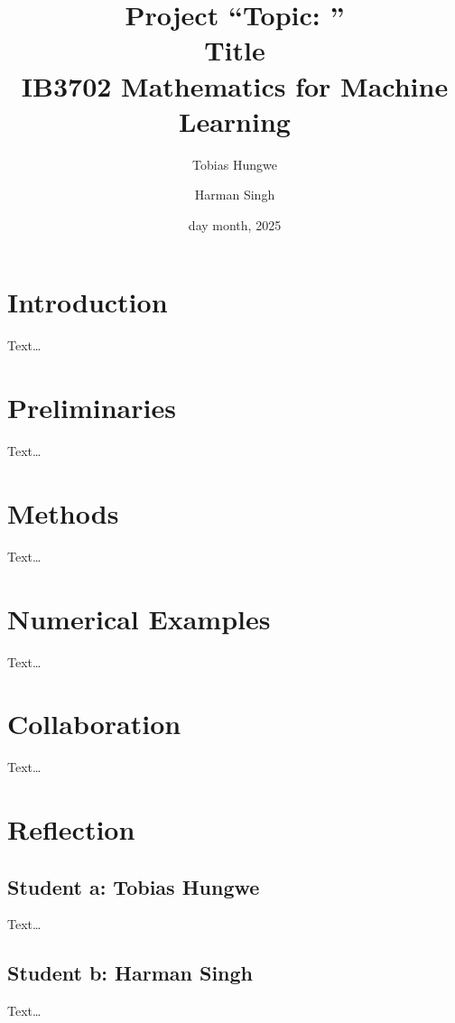 \documentclass[11pt, a4paper]{article}
\title{Project ``Topic: '' \\
	{Title} \\ 
	IB3702 Mathematics for Machine Learning} %
\author{Tobias Hungwe \and Harman Singh} %
\date{day month, 2025} %
\begin{document}
\maketitle

\section{Introduction}

Text\ldots

\section{Preliminaries}

Text\ldots


\section{Methods}

Text\ldots

\section{Numerical Examples}

Text\ldots

\section{Collaboration}

Text\ldots

\section{Reflection}

\subsection{Student a: Tobias Hungwe}

Text\ldots

\subsection{Student b: Harman Singh}

Text\ldots
\end{document}
